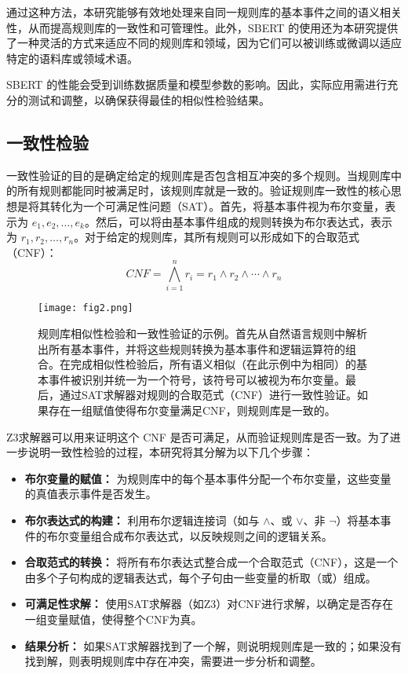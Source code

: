 通过这种方法，本研究能够有效地处理来自同一规则库的基本事件之间的语义相关性，从而提高规则库的一致性和可管理性。此外，SBERT 的使用还为本研究提供了一种灵活的方式来适应不同的规则库和领域，因为它们可以被训练或微调以适应特定的语料库或领域术语。

SBERT 的性能会受到训练数据质量和模型参数的影响。因此，实际应用需进行充分的测试和调整，以确保获得最佳的相似性检验结果。

\subsection{一致性检验}

一致性验证的目的是确定给定的规则库是否包含相互冲突的多个规则。当规则库中的所有规则都能同时被满足时，该规则库就是一致的。验证规则库一致性的核心思想是将其转化为一个可满足性问题（SAT）。首先，将基本事件视为布尔变量，表示为 $e_1, e_2, \ldots, e_k$。然后，可以将由基本事件组成的规则转换为布尔表达式，表示为 $r_1, r_2, \ldots, r_n$。对于给定的规则库，其所有规则可以形成如下的合取范式（CNF）：
$$CNF=\bigwedge_{i=1}^{n}r_i=r_1 \land r_2 \land \cdots \land r_n$$

\begin{figure}[!t]
    \centering
    \texttt{[image: fig2.png]}
    \caption{规则库相似性检验和一致性验证的示例。首先从自然语言规则中解析出所有基本事件，并将这些规则转换为基本事件和逻辑运算符的组合。在完成相似性检验后，所有语义相似（在此示例中为相同）的基本事件被识别并统一为一个符号，该符号可以被视为布尔变量。最后，通过SAT求解器对规则的合取范式（CNF）进行一致性验证。如果存在一组赋值使得布尔变量满足CNF，则规则库是一致的。}
    \label{fig_1}
\end{figure}

Z3求解器可以用来证明这个 CNF 是否可满足，从而验证规则库是否一致。为了进一步说明一致性检验的过程，本研究将其分解为以下几个步骤：

\begin{itemize}
    \item \textbf{布尔变量的赋值：} 为规则库中的每个基本事件分配一个布尔变量，这些变量的真值表示事件是否发生。
    \item \textbf{布尔表达式的构建：} 利用布尔逻辑连接词（如与 $\land$、或 $\lor$、非 $\neg$）将基本事件的布尔变量组合成布尔表达式，以反映规则之间的逻辑关系。
    \item \textbf{合取范式的转换：} 将所有布尔表达式整合成一个合取范式（CNF），这是一个由多个子句构成的逻辑表达式，每个子句由一些变量的析取（或）组成。
    \item \textbf{可满足性求解：} 使用SAT求解器（如Z3）对CNF进行求解，以确定是否存在一组变量赋值，使得整个CNF为真。
    \item \textbf{结果分析：} 如果SAT求解器找到了一个解，则说明规则库是一致的；如果没有找到解，则表明规则库中存在冲突，需要进一步分析和调整。
\end{itemize}

